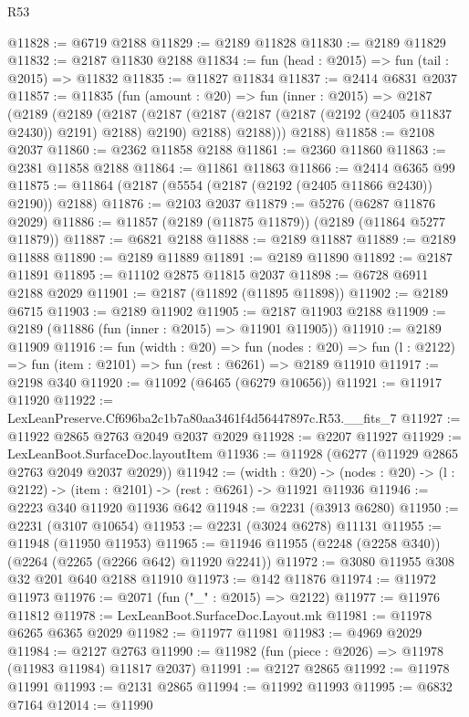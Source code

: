 \begin{lexlean}{R53}
\begin{coremodule}
@11828 := @6719 @2188
@11829 := @2189 @11828
@11830 := @2189 @11829
@11832 := @2187 @11830 @2188
@11834 := fun (head : @2015) => fun (tail : @2015) => @11832
@11835 := @11827 @11834
@11837 := @2414 @6831 @2037
@11857 := @11835
    (fun (amount : @20) =>
    fun (inner : @2015) =>
    @2187
      (@2189
        (@2189
          (@2187
            (@2187 (@2187 (@2187 (@2187 (@2192 (@2405 @11837 @2430)) @2191) @2188) @2190) @2188)
            @2188)))
      @2188)
@11858 := @2108 @2037
@11860 := @2362 @11858 @2188
@11861 := @2360 @11860
@11863 := @2381 @11858 @2188
@11864 := @11861 @11863
@11866 := @2414 @6365 @99
@11875 := @11864 (@2187 (@5554 (@2187 (@2192 (@2405 @11866 @2430)) @2190)) @2188)
@11876 := @2103 @2037
@11879 := @5276 (@6287 @11876 @2029)
@11886 := @11857 (@2189 (@11875 @11879)) (@2189 (@11864 @5277 @11879))
@11887 := @6821 @2188
@11888 := @2189 @11887
@11889 := @2189 @11888
@11890 := @2189 @11889
@11891 := @2189 @11890
@11892 := @2187 @11891
@11895 := @11102 @2875 @11815 @2037
@11898 := @6728 @6911 @2188 @2029
@11901 := @2187 (@11892 (@11895 @11898))
@11902 := @2189 @6715
@11903 := @2189 @11902
@11905 := @2187 @11903 @2188
@11909 := @2189 (@11886 (fun (inner : @2015) => @11901 @11905))
@11910 := @2189 @11909
@11916 := fun (width : @20) =>
  fun (nodes : @20) => fun (l : @2122) => fun (item : @2101) => fun (rest : @6261) => @2189 @11910
@11917 := @2198 @340
@11920 := @11092 (@6465 (@6279 @10656))
@11921 := @11917 @11920
@11922 := LexLeanPreserve.Cf696ba2c1b7a80aa3461f4d56447897c.R53.__fits_7
@11927 := @11922 @2865 @2763 @2049 @2037 @2029
@11928 := @2207 @11927
@11929 := LexLeanBoot.SurfaceDoc.layoutItem
@11936 := @11928 (@6277 (@11929 @2865 @2763 @2049 @2037 @2029))
@11942 := (width : @20) ->
  (nodes : @20) -> (l : @2122) -> (item : @2101) -> (rest : @6261) -> @11921 @11936
@11946 := @2223 @340 @11920 @11936 @642
@11948 := @2231 (@3913 @6280)
@11950 := @2231 (@3107 @10654)
@11953 := @2231 (@3024 @6278) @11131
@11955 := @11948 (@11950 @11953)
@11965 := @11946 @11955 (@2248 (@2258 @340)) (@2264 (@2265 (@2266 @642) @11920 @2241))
@11972 := @3080 @11955 @308 @32 @201 @640 @2188 @11910
@11973 := @142 @11876
@11974 := @11972 @11973
@11976 := @2071 (fun ("_" : @2015) => @2122)
@11977 := @11976 @11812
@11978 := LexLeanBoot.SurfaceDoc.Layout.mk
@11981 := @11978 @6265 @6365 @2029
@11982 := @11977 @11981
@11983 := @4969 @2029
@11984 := @2127 @2763
@11990 := @11982 (fun (piece : @2026) => @11978 (@11983 @11984) @11817 @2037)
@11991 := @2127 @2865
@11992 := @11978 @11991
@11993 := @2131 @2865
@11994 := @11992 @11993
@11995 := @6832 @7164
@12014 := @11990

\end{coremodule}
\end{lexlean}
